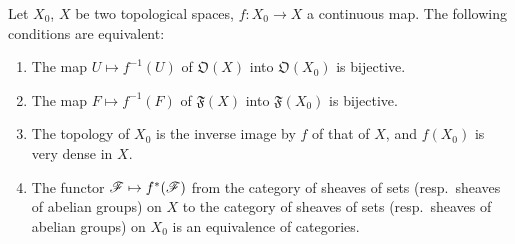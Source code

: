 \begin{proposition}[10.2.1]
\label{IV.10.2.1}
Let $X_0$, $X$ be two topological spaces, $f:X_0\to X$ a continuous map.
The following conditions are equivalent:
\begin{enumerate}[label=\emph{\alph*)}]
  \item The map $U\mapsto f^{-1}(U)$ of $\mathfrak{O}(X)$ into $\mathfrak{O}(X_0)$ is bijective.
  \item[\rm a$'$)] The map $F\mapsto f^{-1}(F)$ of $\mathfrak{F}(X)$ into $\mathfrak{F}(X_0)$ is bijective.
  \item The topology of $X_0$ is the inverse image by $f$ of that of $X$, and $f(X_0)$ is very dense  in $X$.
  \item The functor $\mathscr{F}\mapsto f^*(\mathscr{F})$ from the category of sheaves of sets (resp.\ sheaves of abelian groups) on $X$ to the category of sheaves of sets (resp.\ sheaves of abelian groups) on $X_0$ is an equivalence of categories.
\end{enumerate}
\end{proposition}

